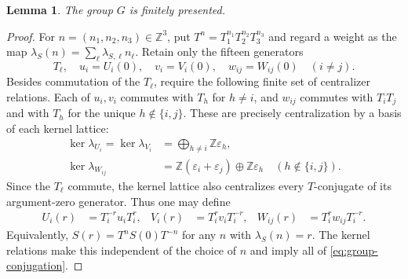 \documentclass[11pt]{article}
\numberwithin{equation}{section}
\newtheorem{lemma}[theorem]{Lemma}
\theoremstyle{definition}
\theoremstyle{remark}
\newcommand{\Z}{\mathbb Z}
\begin{document}
\begin{lemma}
\label{lem:group-finite-presentation}
The group $G$ is finitely presented.
\end{lemma}

\begin{proof}
For $n=(n_1,n_2,n_3)\in\Z^3$, put
$T^n=T_1^{n_1}T_2^{n_2}T_3^{n_3}$ and regard a weight as the map
$\lambda_S(n)=\sum_\ell\lambda_{S,\ell}n_\ell$.  Retain only the
fifteen generators
\[
  T_\ell,\quad u_i=U_i(0),\quad v_i=V_i(0),\quad
  w_{ij}=W_{ij}(0)\quad(i\neq j).
\]
Besides commutation of the $T_\ell$, require the following finite
set of centralizer relations.  Each of $u_i,v_i$ commutes with
$T_h$ for $h\neq i$, and $w_{ij}$ commutes with $T_iT_j$ and with
$T_h$ for the unique $h\notin\{i,j\}$.  These are precisely
centralization by a basis of each kernel lattice:
\[
\begin{aligned}
 \ker\lambda_{U_i}=\ker\lambda_{V_i}
   &=\bigoplus_{h\neq i}\Z\varepsilon_h,\\
 \ker\lambda_{W_{ij}}
   &=\Z(\varepsilon_i+\varepsilon_j)
     \oplus\Z\varepsilon_h
       \quad(h\notin\{i,j\}).
\end{aligned}
\]
Since the $T_\ell$ commute, the kernel lattice also centralizes
every $T$-conjugate of its argument-zero generator.  Thus one may define
\begin{equation}
\begin{aligned}
  U_i(r)&=T_i^{-r}u_iT_i^r,&
  V_i(r)&=T_i^rv_iT_i^{-r},&
  W_{ij}(r)&=T_i^rw_{ij}T_i^{-r}.
\end{aligned}
\label{eq:group-finite-generators}
\end{equation}
Equivalently, $S(r)=T^nS(0)T^{-n}$ for any $n$ with
$\lambda_S(n)=r$.  The kernel relations make this independent of
the choice of $n$ and imply all of \eqref{eq:group-conjugation}.


\end{proof}
\end{document}
